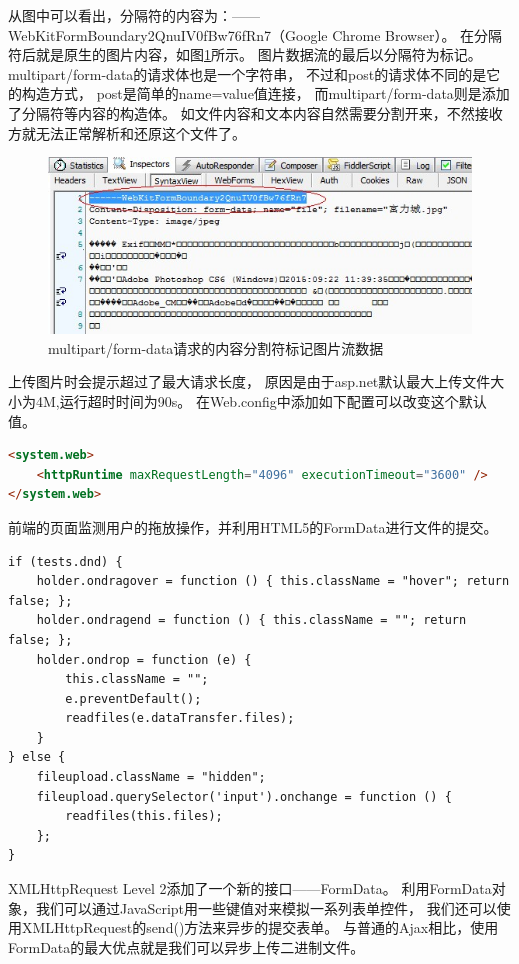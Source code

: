 \documentclass{book}
\begin{document}
从图中可以看出，分隔符的内容为：------WebKitFormBoundary2QnuIV0fBw76fRn7（Google Chrome Browser）。
在分隔符后就是原生的图片内容，如图\ref{fig:HTTPPostSplitWithRawData}所示。
图片数据流的最后以分隔符为标记。
multipart/form-data的请求体也是一个字符串，
不过和post的请求体不同的是它的构造方式，
post是简单的name=value值连接，
而multipart/form-data则是添加了分隔符等内容的构造体。
如文件内容和文本内容自然需要分割开来，不然接收方就无法正常解析和还原这个文件了。

\begin{figure}[htbp]
	\centering
	\includegraphics[scale=0.8]{HTTPPostSplitWithRawData.jpg}
	\caption{multipart/form-data请求的内容分割符标记图片流数据}
	\label{fig:HTTPPostSplitWithRawData}
\end{figure}

上传图片时会提示超过了最大请求长度，
原因是由于asp.net默认最大上传文件大小为4M,运行超时时间为90s。
在Web.config中添加如下配置可以改变这个默认值。

\begin{lstlisting}[language=HTML]
<system.web>
	<httpRuntime maxRequestLength="4096" executionTimeout="3600" />
</system.web>
\end{lstlisting}

前端的页面监测用户的拖放操作，并利用HTML5的FormData进行文件的提交。

\begin{lstlisting}[language=VBScript]
if (tests.dnd) {
    holder.ondragover = function () { this.className = "hover"; return false; };
    holder.ondragend = function () { this.className = ""; return false; };
    holder.ondrop = function (e) {
        this.className = "";
        e.preventDefault();
        readfiles(e.dataTransfer.files);
    }
} else {
    fileupload.className = "hidden";
    fileupload.querySelector('input').onchange = function () {
        readfiles(this.files);
    };
}
\end{lstlisting}

XMLHttpRequest Level 2添加了一个新的接口——FormData。
利用FormData对象，我们可以通过JavaScript用一些键值对来模拟一系列表单控件，
我们还可以使用XMLHttpRequest的send()方法来异步的提交表单。
与普通的Ajax相比，使用FormData的最大优点就是我们可以异步上传二进制文件。
\end{document}
